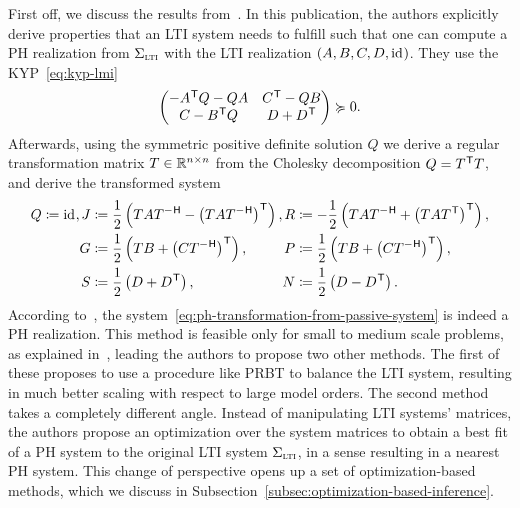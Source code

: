 First off, we discuss the results from~\cite{Beattie2022}.
In this publication, the authors explicitly derive properties that an \ac{LTI} system needs to fulfill such that one can compute a \ac{PH} realization from $\Sigma_{\textnormal{\scshape lti}}$ with the \ac{LTI} realization $(A, B, C, D, \text{id}_{})$.
They use the \ac{KYP}~\eqref{eq:kyp-lmi}
\begin{equation*}
    \begin{pmatrix}
        - A^{\mkern1mu \mathsf{T}} Q - Q A & C^{\mkern1mu \mathsf{T}} - QB \\
        C - B^{\mkern1mu \mathsf{T}} Q & D + D^{\mkern1mu \mathsf{T}}
    \end{pmatrix} \succcurlyeq 0.
\end{equation*}
Afterwards, using the symmetric positive definite solution $Q$ we derive a regular transformation matrix $T \in \mathbb{R}^{n \times n}$ from the Cholesky decomposition $Q = T^{\mkern1mu \mathsf{T}} T$, and derive the transformed system
\begin{equation}\label{eq:ph-transformation-from-passive-system}
    \begin{alignedat}{8}
        Q &\coloneqq \id, &J &\coloneqq \frac{1}{2} \left( T A T\inv - {\left( T A T\inv \right)}\trans \right), &R &\coloneqq -\frac{1}{2} \left( T A T\inv + {\left( T A T\trans \right)}\trans \right), \\
        & &G &\coloneqq \frac{1}{2} \left( T B + {\left( C T\inv \right)}\trans \right), &P &\coloneqq \frac{1}{2} \left( T B + {\left( C T\inv \right)}\trans \right), \\
        & &S &\coloneqq \frac{1}{2} \left( D + D\trans \right), &N &\coloneqq \frac{1}{2} \left( D - D\trans \right).
    \end{alignedat}
\end{equation}
According to~\cite{Beattie2011}, the system~\eqref{eq:ph-transformation-from-passive-system} is indeed a \ac{PH} realization.
This method is feasible only for small to medium scale problems, as explained in~\cite{Cherifi2019}, leading the authors to propose two other methods.
The first of these proposes to use a procedure like \ac{PRBT} to balance the \ac{LTI} system, resulting in much better scaling with respect to large model orders.
The second method takes a completely different angle.
Instead of manipulating \ac{LTI} systems' matrices, the authors propose an optimization over the system matrices to obtain a best fit of a \ac{PH} system to the original \ac{LTI} system $\Sigma_{\textnormal{\scshape lti}}$, in a sense resulting in a nearest \ac{PH} system.
This change of perspective opens up a set of optimization-based methods, which we discuss in Subsection~\ref{subsec:optimization-based-inference}.

